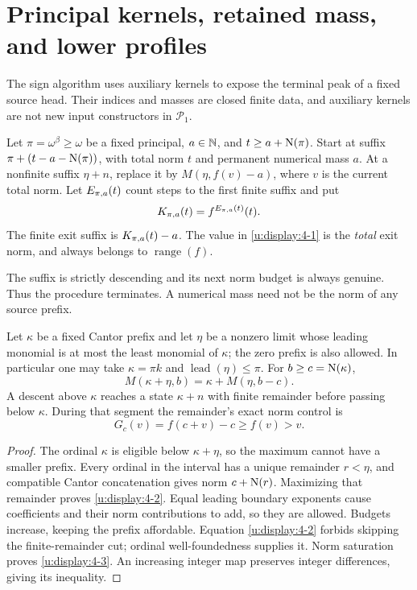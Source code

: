 \section{Principal kernels, retained mass, and lower profiles}
\label{u:sec:kernels}
The sign algorithm uses auxiliary kernels to expose the terminal peak of
a fixed source head. Their indices and masses are closed finite data,
and auxiliary kernels are not new input constructors in $\mathcal P_1$.

\begin{definition}\label{u:def:kernel}
Let $\pi=\omega^\beta\ge\omega$ be a fixed principal, $a\in\mathbb N$, and
$t\ge a+\operatorname{N}(\pi)$. Start at suffix
$\pi+(t-a-\operatorname{N}(\pi))$, with total norm $t$ and permanent numerical mass
$a$. At a nonfinite suffix $\eta+n$, replace it by
$M(\eta,f(v)-a)$, where $v$ is the current total norm.
Let $E_{\pi,a}(t)$ count steps to the first finite suffix and put
\begin{equation}
              K_{\pi,a}(t)=f^{E_{\pi,a}(t)}(t).        \label{u:display:4-1}
\end{equation}
The finite exit suffix is $K_{\pi,a}(t)-a$. The value in \eqref{u:display:4-1} is the
\emph{total} exit norm, and always belongs to $\operatorname{range}(f)$.
\end{definition}
The suffix is strictly descending and its next norm budget is always
genuine. Thus the procedure terminates. A numerical mass need not be the
norm of any source prefix.

\begin{lemma}\label{u:lem:prefix}
Let $\kappa$ be a fixed Cantor prefix and let $\eta$ be a nonzero limit
whose leading monomial is at most the least monomial of $\kappa$;
the zero prefix is also allowed. In particular one may take
$\kappa=\pi k$ and $\operatorname{lead}(\eta)\le\pi$.
For $b\ge c=\operatorname{N}(\kappa)$,
\begin{equation}
 M(\kappa+\eta,b)=\kappa+M(\eta,b-c).                \label{u:display:4-2}
\end{equation}
A descent above $\kappa$ reaches a state $\kappa+n$ with finite remainder
before passing below $\kappa$. During that segment the remainder's exact
norm control is
\begin{equation}
                   G_c(v)=f(c+v)-c\ge f(v)>v.         \label{u:display:4-3}
\end{equation}
\end{lemma}
\begin{proof}
The ordinal $\kappa$ is eligible below $\kappa+\eta$, so the maximum cannot
have a smaller prefix. Every ordinal in the interval has a unique remainder
$r<\eta$, and compatible Cantor concatenation gives norm $c+\operatorname{N}(r)$.
Maximizing that remainder proves \eqref{u:display:4-2}. Equal leading boundary exponents
cause coefficients and their norm contributions to add, so they are allowed.
Budgets increase, keeping the prefix affordable. Equation \eqref{u:display:4-2} forbids
skipping the finite-remainder cut; ordinal well-foundedness supplies it.
Norm saturation proves \eqref{u:display:4-3}. An increasing integer map preserves integer
differences, giving its inequality.
\end{proof}

